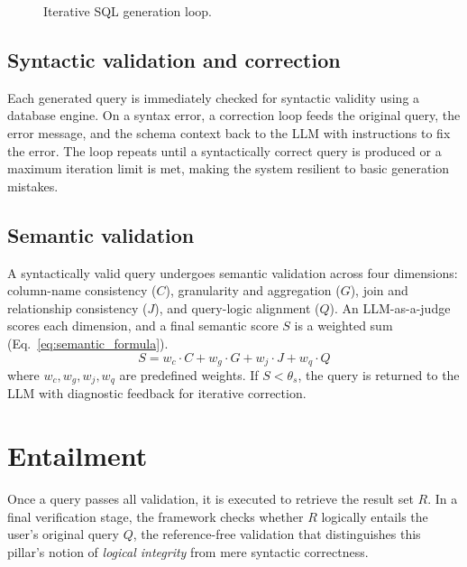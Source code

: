 \begin{figure}[ht]
{
}
\caption{Iterative SQL generation loop.}
\label{fig:sql-gen-loop}
\end{figure}

\subsection{Syntactic validation and correction}
Each generated query is immediately checked for syntactic validity using a database engine. On a syntax error, a correction loop feeds the original query, the error message, and the schema context back to the LLM with instructions to fix the error. The loop repeats until a syntactically correct query is produced or a maximum iteration limit is met, making the system resilient to basic generation mistakes.

\subsection{Semantic validation}
A syntactically valid query undergoes semantic validation across four dimensions: column-name consistency ($C$), granularity and aggregation ($G$), join and relationship consistency ($J$), and query-logic alignment ($Q$). An LLM-as-a-judge scores each dimension, and a final semantic score $S$ is a weighted sum (Eq.~\ref{eq:semantic_formula}).
\begin{equation} \label{eq:semantic_formula}
S = w_c \cdot C + w_g \cdot G + w_j \cdot J + w_q \cdot Q
\end{equation}
where $w_c, w_g, w_j, w_q$ are predefined weights. If $S < \theta_s$, the query is returned to the LLM with diagnostic feedback for iterative correction.

\section{Entailment}
Once a query passes all validation, it is executed to retrieve the result set $R$. In a final verification stage, the framework checks whether $R$ logically entails the user's original query $Q$, the reference-free validation that distinguishes this pillar's notion of \emph{logical integrity} from mere syntactic correctness.

